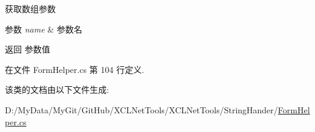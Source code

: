 获取数组参数 


\begin{DoxyParams}{参数}
{\em name} & 参数名\\
\hline
\end{DoxyParams}
\begin{DoxyReturn}{返回}
参数值
\end{DoxyReturn}


在文件 Form\-Helper.\-cs 第 104 行定义.



该类的文档由以下文件生成\-:\begin{DoxyCompactItemize}
\item 
D\-:/\-My\-Data/\-My\-Git/\-Git\-Hub/\-X\-C\-L\-Net\-Tools/\-X\-C\-L\-Net\-Tools/\-String\-Hander/\hyperlink{_form_helper_8cs}{Form\-Helper.\-cs}\end{DoxyCompactItemize}

